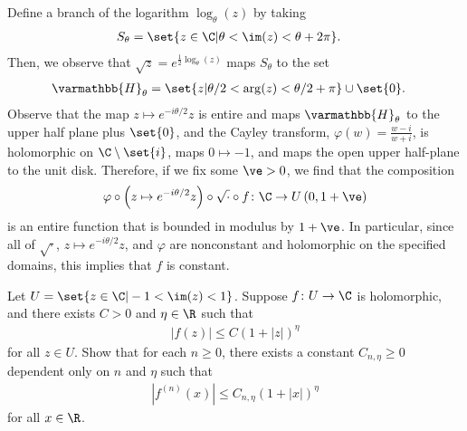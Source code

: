 \documentclass[10pt]{mypackage}
\renewcommand*{\mathbb}[1]{\varmathbb{#1}}
\begin{document}
\begin{solution}
\begin{enumerate}[(a)]
      Define a branch of the logarithm $\log_{\theta}(z)$ by taking
      \begin{align*}
        S_{\theta} &= \set{z\in \C | \theta < \im(z) < \theta + 2\pi}.
      \end{align*}
      Then, we observe that $\sqrt{z} = e^{\frac{1}{2}\log_{\theta}(z)}$ maps $S_{\theta}$ to the set
      \begin{align*}
        \mathbb{H}_{\theta} &= \set{z | \theta/2 < \arg(z) < \theta/2 + \pi} \cup \set{0}.
      \end{align*}
      Observe that the map $z\mapsto e^{-i\theta/2}z$ is entire and maps $ \mathbb{H}_{\theta} $ to the upper half plane plus $\set{0}$, and the Cayley transform, $\varphi(w) = \frac{w-i}{w+i}$, is holomorphic on $\C\setminus \set{i}$, maps $0\mapsto -1$, and maps the open upper half-plane to the unit disk. Therefore, if we fix some $\ve > 0$, we find that the composition
      \begin{align*}
        \varphi\circ \left( z\mapsto e^{-i\theta/2}z \right) \circ \sqrt{\cdot}\circ f\colon \C\rightarrow U\left( 0, 1 + \ve \right)
      \end{align*}
      is an entire function that is bounded in modulus by $ 1 + \ve $. In particular, since all of $\sqrt{\cdot}$, $z\mapsto e^{-i\theta/2}z$, and $\varphi$ are nonconstant and holomorphic on the specified domains, this implies that $f$ is constant.
  \end{enumerate}
\end{solution}
\begin{problem}[Problem 4]
  Let $U = \set{z\in \C | -1 < \im(z) < 1}$. Suppose $f\colon U\rightarrow \C$ is holomorphic, and there exists $C > 0$ and $ \eta\in \R $ such that
  \begin{align*}
    \left\vert f(z) \right\vert \leq C\left( 1 + \left\vert z \right\vert \right)^{\eta}
  \end{align*}
  for all $z\in U$. Show that for each $n \geq 0$, there exists a constant $ C_{n,\eta} \geq 0 $ dependent only on $n$ and $\eta$ such that
  \begin{align*}
    \left\vert f^{(n)}(x) \right\vert \leq C_{n,\eta} \left( 1 + \left\vert x \right\vert \right)^{\eta}
  \end{align*}
  for all $x\in \R$.
\end{problem}
\end{document}
